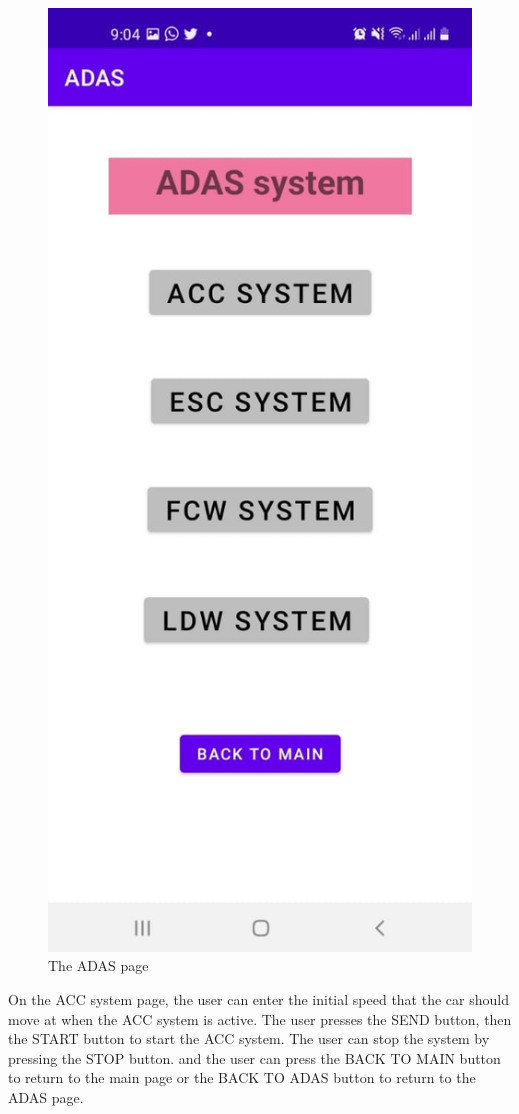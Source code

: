 \documentclass[12pt,a4paper]{report}
\begin{document}
\begin{figure}[H]
    \centering
    \graphicspath{ {./images/} }
    \includegraphics[width=.5\textwidth,height=.5\textheight ]{adas.jpg}
    \caption{ The ADAS page}
    \label{fig:mesh1}
\end{figure}
On the ACC system page, the user can enter the initial speed that the car should move at when the ACC system is active. The user presses the SEND button, then the START button to start the ACC system. The user can stop the system by pressing the STOP button.  and the user can press the BACK TO MAIN button to return to the main page or the BACK TO ADAS button to return to the ADAS page.
\end{document}
